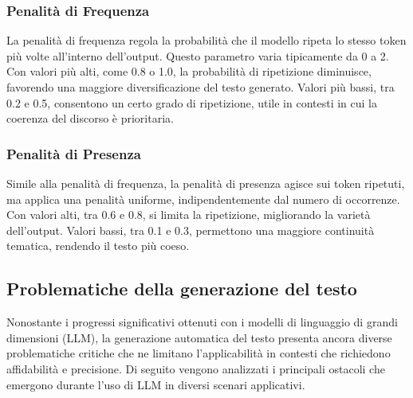 \documentclass[target=mst,aauheader=,style=]{thud}
\begin{document}
\subsubsection{Penalità di Frequenza}
La penalità di frequenza regola la probabilità che il modello ripeta lo stesso token più volte all’interno dell’output. Questo parametro varia tipicamente da 0 a 2. Con valori più alti, come 0.8 o 1.0, la probabilità di ripetizione diminuisce, favorendo una maggiore diversificazione del testo generato. Valori più bassi, tra 0.2 e 0.5, consentono un certo grado di ripetizione, utile in contesti in cui la coerenza del discorso è prioritaria.

\subsubsection{Penalità di Presenza}
Simile alla penalità di frequenza, la penalità di presenza agisce sui token ripetuti, ma applica una penalità uniforme, indipendentemente dal numero di occorrenze. Con valori alti, tra 0.6 e 0.8, si limita la ripetizione, migliorando la varietà dell’output. Valori bassi, tra 0.1 e 0.3, permettono una maggiore continuità tematica, rendendo il testo più coeso.

\subsection{Problematiche della generazione del testo}
Nonostante i progressi significativi ottenuti con i modelli di linguaggio di grandi dimensioni (LLM), la generazione automatica del testo presenta ancora diverse problematiche critiche che ne limitano l’applicabilità in contesti che richiedono affidabilità e precisione. Di seguito vengono analizzati i principali ostacoli che emergono durante l’uso di LLM in diversi scenari applicativi.
\end{document}
